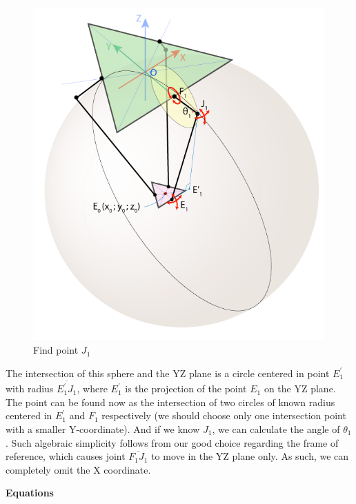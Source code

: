 \begin{figure}[H]
	\centering
	\includegraphics[width=\maxwidth{11cm}, keepaspectratio]{Chapters/Fig/find_point_J1.png}
	\caption{Find point $J_{1}$}
	\label{fig:find_point_J1}
\end{figure}
The intersection of this sphere and the YZ plane is a circle centered in point $E^{'}_{1}$ with radius $\overline{E^{'}_{1}J_{1}}$, where $E^{'}_{1}$ is the projection of the point $E_{1}$ on the YZ plane. The point can be found now as the intersection of two circles of known radius centered in $E^{'}_{1}$ and $F_{1}$ respectively (we should choose only one intersection point with a smaller Y-coordinate). And if we know $J_{1}$, we can calculate the angle of $\theta_{1}$.
Such algebraic simplicity follows from our good choice regarding the frame of reference, which causes joint $\overline{F_{1}J_{1}}$ to move in the YZ plane only. As such, we can completely omit the X coordinate.

\textbf{Equations} \\


